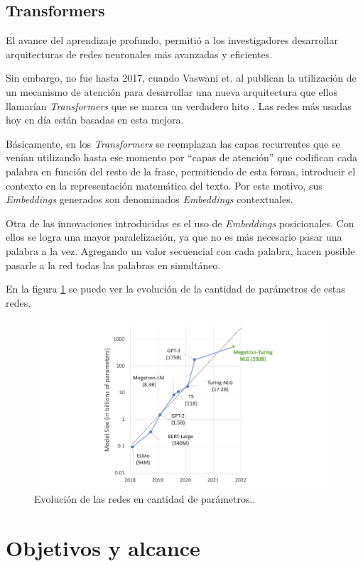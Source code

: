 \subsection{Transformers}

El avance del aprendizaje profundo, permitió a los investigadores desarrollar arquitecturas de redes neuronales más avanzadas y eficientes. 

Sin embargo, no fue hasta 2017, cuando Vaswani et. al publican la utilización de un mecanismo de atención para desarrollar una nueva arquitectura que ellos llamarían \textit{Transformers} que se marca un verdadero hito \citep{ARTICLE:5}. Las redes más usadas hoy en día están basadas en esta mejora.

Básicamente, en los \textit{Transformers} se reemplazan las capas recurrentes que se venían utilizando hasta ese momento por ``capas de atención'' que codifican cada palabra en función del resto de la frase, permitiendo de esta forma, introducir el contexto en la representación matemática del texto. Por este motivo, sus \textit{Embeddings} generados son denominados \textit{Embeddings} contextuales.

Otra de las innovaciones introducidas es el uso de \textit{Embeddings} posicionales. Con ellos se logra una mayor paralelización, ya que no es más necesario pasar una palabra a la vez. Agregando un valor secuencial con cada palabra, hacen posible pasarle a la red todas las palabras en simultáneo.

En la figura \ref{fig:transformers} se puede ver la evolución de la cantidad de parámetros de estas redes.

\begin{figure}[htbp]
	\centering
	\includegraphics[width=1\textwidth]{./Figures/transformers.png}
	\caption{Evolución de las redes en cantidad de parámetros.\protect\footnotemark.}
	\label{fig:transformers}
\end{figure}



\section{Objetivos y alcance}


